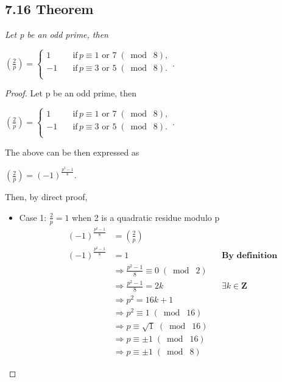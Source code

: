 \documentclass{article}
\begin{document}
\subsection*{7.16 Theorem} 
\quad \textit{Let p be an odd prime, then}
\begin{center}
    $(\frac{2}{p}) = \begin{cases}
          1 \quad &\text{if} \, p \equiv 1 \text{ or } 7\;(\bmod\; 8),\\
          -1 \quad &\text{if} \, p \equiv 3 \text{ or } 5 \;(\bmod\; 8).\\
     \end{cases}$.
\end{center}

\begin{proof}
Let p be an odd prime, then
\begin{center}
    $(\frac{2}{p}) = \begin{cases}
          1 \quad &\text{if} \, p \equiv 1 \text{ or } 7\;(\bmod\; 8),\\
          -1 \quad &\text{if} \, p \equiv 3 \text{ or } 5 \;(\bmod\; 8).\\
     \end{cases}$.
\end{center}
The above can be then expressed as
\begin{center}
    $(\frac{2}{p}) = (-1)^{\frac{p^2-1}{8}}$.
\end{center}
Then, by direct proof,
\begin{itemize}
    \item Case 1: $\frac{2}{p} = 1$ when 2 is a quadratic residue modulo p
    \begin{align*}
    && (-1)^{\frac{p^2-1}{8}}&= (\frac{2}{p})&&\\
    && (-1)^{\frac{p^2-1}{8}}&= 1&& \textbf{By definition}\\
    && &\Longrightarrow \frac{p^2-1}{8} \equiv 0 \;(\bmod\; 2)&&\\
    && &\Longrightarrow \frac{p^2-1}{8} = 2k&&\textbf{$\exists k\in \mathbf{Z}$}\\
    && &\Longrightarrow p^2 = 16k + 1&&\\
    && &\Longrightarrow p^2 \equiv 1 \;(\bmod\; 16) &&\\
    && &\Longrightarrow p \equiv \sqrt{1} \;(\bmod\; 16) &&\\
    && &\Longrightarrow p \equiv \pm1 \;(\bmod\; 16) &&\\
    && &\Longrightarrow p \equiv \pm1 \;(\bmod\; 8) &&
\end{align*}

\end{itemize}
\end{proof}
\end{document}
